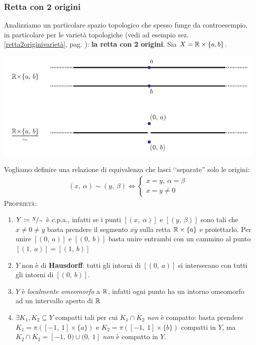 \subsubsection{Retta con 2 origini} \label{retta 2 origini}
Analizziamo un particolare spazio topologico che spesso funge da controesempio, in particolare per le varietà topologiche (vedi ad esempio sez. \ref{retta2originivarietà}, pag. \pageref{retta2originivarietà}): \textbf{la retta con 2 origini}. \newline
Sia $X=\mathbb{R}\times\{a,b\}$.
\begin{center}
	\includegraphics[trim=0cm 0cm 0cm 0cm,clip,scale=0.95]{images/line2origins.pdf}
\end{center}
Vogliamo definire una relazione di equivalenza che lasci ‘‘separate'' solo le origini:
	\begin{gather*}
		(x, \ \alpha)\sim (y, \ \beta) \iff
			\begin{cases}
				x=y,\ \alpha=\beta \\
				x=y\neq 0
			\end{cases}		
	\end{gather*}
\textsc{Proprietà}:
\begin{enumerate}
	\item $Y\coloneqq \nicefrac{X}{\sim}$ è c.p.a., infatti se i punti $[(x, \ \alpha)]$ e $[(y, \ \beta)]$ sono tali che $x\neq 0 \neq y$ basta prendere il segmento $\overline{xy}$ sulla retta $\mathbb{R}\times\{a\}$ e proiettarlo. Per unire $[(0,\ a)]$ e $[(0, \ b)]$ basta unire entrambi con un cammino al punto $[(1, \ a)]=[(1, \ b)]$
	\item $Y$ non è di \textbf{Hausdorff}: tutti gli intorni di $[(0, \ a)]$ si intersecano con tutti gli intorni di $[(0, \ b)]$.
	\item $Y$ è \textit{localmente omeomorfo} a $\mathbb{R}$, infatti ogni punto ha un intorno omeomorfo ad un intervallo aperto di $\mathbb{R}$
	\item $\exists K_1, K_2\subseteq Y$ compatti tali per cui $K_1\cap K_2$ \textit{non} è compatto: basta prendere $K_1=\pi\left([-1, \ 1]\times \{a\} \right)$ e $K_2=\pi\left([-1, \ 1]\times \{b\} \right)$ compatti in $Y$, ma $K_2\cap K_2= [-1,\ 0) \cup (0,\ 1]$ \textit{non} è compatto in $Y$.
\end{enumerate}
